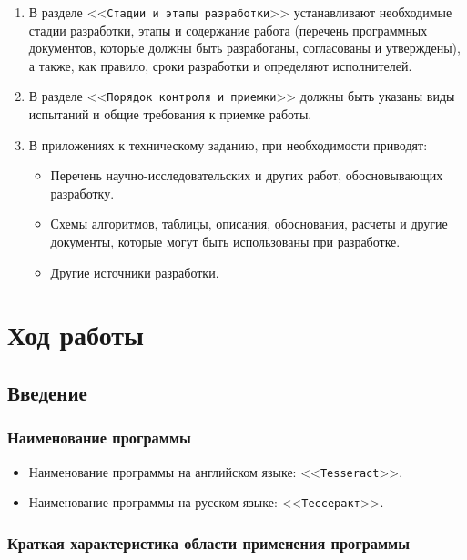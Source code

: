 \documentclass[a4paper, 14pt]{article}
\begin{document}
\begin{enumerate}
\begin{itemize}
    \end{itemize}
    \item В разделе <<\texttt{Стадии и этапы разработки}>> устанавливают необходимые стадии разработки, этапы и содержание работа (перечень программных документов, которые должны быть разработаны, согласованы и утверждены), а также, как правило, сроки разработки и определяют исполнителей.
    \item В разделе <<\texttt{Порядок контроля и приемки}>> должны быть указаны виды испытаний и общие требования к приемке работы.
    \item В приложениях к техническому заданию, при необходимости приводят:
    \begin{itemize}
        \item Перечень научно-исследовательских и других работ, обосновывающих разработку.
        \item Схемы алгоритмов, таблицы, описания, обоснования, расчеты и другие документы, которые могут быть использованы при разработке.
        \item Другие источники разработки.
    \end{itemize}
\end{enumerate}

\newpage
\section{Ход работы}

\subsection{Введение}

\subsubsection{Наименование программы}

\begin{itemize}
    \item Наименование программы на английском языке: <<\texttt{Tesseract}>>.
    \item Наименование программы на русском языке: <<\texttt{Тессеракт}>>.
\end{itemize}

\subsubsection{Краткая характеристика области применения программы}
\end{document}
